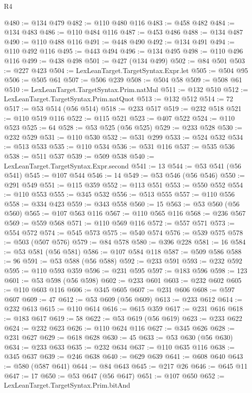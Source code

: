 \begin{lexlean}{R4}
\begin{coremodule}
@480 := @134 @479
@482 := @110 @480 @116
@483 := @458 @482
@484 := @134 @483
@486 := @110 @484 @116
@487 := @453 @486
@488 := @134 @487
@490 := @110 @488 @116
@491 := @448 @490
@492 := @134 @491
@494 := @110 @492 @116
@495 := @443 @494
@496 := @134 @495
@498 := @110 @496 @116
@499 := @438 @498
@501 := @427 (@134 @499)
@502 := @84 @501
@503 := @227 @423
@504 := LexLeanTarget.TargetSyntax.Expr.let
@505 := @504 @95
@506 := @505 @61
@507 := @506 @239
@508 := @504 @58
@509 := @508 @61
@510 := LexLeanTarget.TargetSyntax.Prim.natMul
@511 := @132 @510
@512 := LexLeanTarget.TargetSyntax.Prim.natQuot
@513 := @132 @512
@514 := 72
@517 := @53 @514 (@56 @514)
@518 := @233 @517
@519 := @232 @518
@521 := @110 @519 @116
@522 := @115 @521
@523 := @407 @522
@524 := @110 @523
@525 := 64
@528 := @53 @525 (@56 @525)
@529 := @233 @528
@530 := @232 @529
@531 := @110 @530
@532 := @531 @299
@533 := @524 @532
@534 := @513 @533
@535 := @110 @534
@536 := @531 @116
@537 := @535 @536
@538 := @511 @537
@539 := @509 @538
@540 := LexLeanTarget.TargetSyntax.Expr.second
@541 := 13
@544 := @53 @541 (@56 @541)
@545 := @107 @544
@546 := 14
@549 := @53 @546 (@56 @546)
@550 := @291 @549
@551 := @115 @359
@552 := @113 @551
@553 := @550 @552
@554 := @110 @553
@555 := @345 @532
@556 := @513 @555
@557 := @110 @556
@558 := @334 @423
@559 := @343 @558
@560 := 15
@563 := @53 @560 (@56 @560)
@565 := @107 @563 @116
@567 := @110 @565 @116
@568 := @236 @567
@569 := @559 @568
@571 := @110 @569 @116
@572 := @557 @571
@573 := @554 @572
@574 := @545 @573
@575 := @540 @574
@576 := @539 @575
@578 := @503 (@507 @576)
@579 := @84 @578
@580 := @396 @228
@581 := 16
@584 := @53 @581 (@56 @581)
@586 := @107 @584 @118
@587 := @509 @586
@588 := 96
@591 := @53 @588 (@56 @588)
@592 := @233 @591
@593 := @232 @592
@595 := @110 @593 @359
@596 := @231 @595
@597 := @183 @596
@598 := 123
@601 := @53 @598 (@56 @598)
@602 := @233 @601
@603 := @232 @602
@605 := @110 @603 @116
@606 := @345 @605
@607 := @231 @606
@608 := @597 @607
@609 := 47
@612 := @53 @609 (@56 @609)
@613 := @233 @612
@614 := @232 @613
@615 := @110 @614
@616 := @615 @359
@617 := @231 @616
@618 := @183 @617
@619 := 58
@622 := @53 @619 (@56 @619)
@623 := @233 @622
@624 := @232 @623
@626 := @110 @624 @116
@627 := @345 @626
@628 := @231 @627
@629 := @618 @628
@630 := 45
@633 := @53 @630 (@56 @630)
@634 := @233 @633
@635 := @232 @634
@637 := @110 @635 @116
@638 := @345 @637
@639 := @246 @638
@640 := @629 @639
@641 := @608 @640
@643 := @580 (@587 @641)
@644 := @84 @643
@645 := @217 @26
@646 := @645 @11
@647 := 17
@650 := @53 @647 (@56 @647)
@651 := @107 @650
@652 := LexLeanTarget.TargetSyntax.Prim.bitAnd

\end{coremodule}
\end{lexlean}

